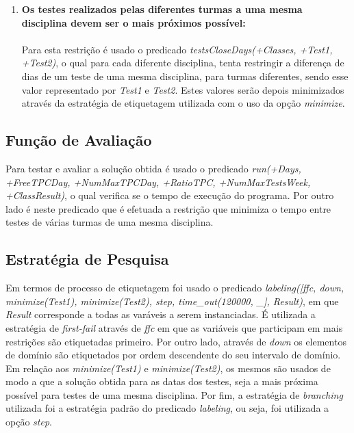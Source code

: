 \documentclass{llncs}
\begin{document}
\begin{enumerate}
		\\
	\item \textbf{Os testes realizados pelas diferentes turmas a uma mesma disciplina devem ser o mais próximos possível:}\\\\	               
	Para esta restrição é usado o predicado \textit{testsCloseDays(+Classes, +Test1, +Test2)}, o qual para cada diferente disciplina, tenta restringir a diferença de dias de um teste de uma mesma disciplina, para turmas diferentes, sendo esse valor representado por \textit{Test1}	e \textit{Test2}. Estes valores serão depois minimizados através da estratégia de etiquetagem utilizada com o uso da opção \textit{minimize}.	\\
		
	

\end{enumerate} 

\subsection{ Função de Avaliação}
Para testar e avaliar a solução obtida é usado o predicado \textit{run(+Days, +FreeTPCDay, +NumMaxTPCDay, +RatioTPC, +NumMaxTestsWeek, +ClassResult)}, o qual verifica se o tempo de execução do programa. Por outro lado é neste predicado que é efetuada a restrição que minimiza o tempo entre testes de várias turmas de uma mesma disciplina.

\subsection{Estratégia de Pesquisa}
Em termos de processo de etiquetagem foi usado o predicado \textit{labeling([ffc, down, minimize(Test1), minimize(Test2), step, time\_out(120000, \_], Result)}, em que \textit{Result} corresponde a todas as varáveis a serem instanciadas.
É utilizada a estratégia de \textit{first-fail} através de \textit{ffc} em que as variáveis que participam  em mais restrições são etiquetadas primeiro. Por outro lado, através de \textit{down} os elementos de domínio são etiquetados por ordem descendente do seu intervalo de domínio.\\
Em relação aos \textit{minimize(Test1)} e \textit{minimize(Test2)}, os mesmos são usados de modo a que a solução obtida para as datas dos testes, seja a mais próxima possível para testes de uma mesma disciplina.
Por fim, a estratégia de \textit{branching} utilizada foi a estratégia padrão do predicado \textit{labeling}, ou seja, foi utilizada a opção \textit{step}.
\end{document}
